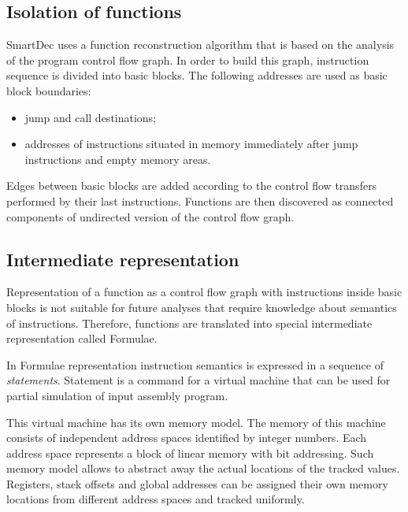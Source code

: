 \documentclass[10pt, conference, compsocconf]{IEEEtran}
\newcommand{\compact}{}
\newcommand{\skipspace}{}
\newcommand{\skipsectionspace}{}
\begin{document}
\subsection{Isolation of functions}\skipsectionspace
SmartDec uses a function reconstruction algorithm that is based on
the analysis of the program control flow graph.
In order to build this graph, instruction sequence is divided into
basic blocks. 
The following addresses are used as basic block boundaries:
\skipspace\begin{itemize}\compact
\item jump and call destinations;
\item addresses of instructions situated in memory immediately
after jump instructions and empty memory areas.
\end{itemize}
Edges between basic blocks are added according to the control flow
transfers performed by their last instructions.
Functions are then discovered as connected
components of undirected version of the control flow graph.


\subsection{Intermediate representation}\skipsectionspace
Representation of a function as a control flow graph with
instructions inside basic blocks is not suitable for future
analyses that require knowledge about semantics of instructions.
Therefore, functions are translated into special intermediate
representation called Formulae.

In Formulae representation instruction semantics is expressed
in a sequence of \emph{statements}. 
Statement is a command for a virtual machine that can be used 
for partial simulation of input assembly program.

This virtual machine has its own memory model. 
The memory of this machine consists of independent address 
spaces identified by integer numbers. 
Each address space represents a block of linear memory with bit addressing. 
Such memory model allows to abstract away the actual locations 
of the tracked values. 
Registers, stack offsets and global addresses can be assigned 
their own memory locations from different address spaces 
and tracked uniformly.
\end{document}
